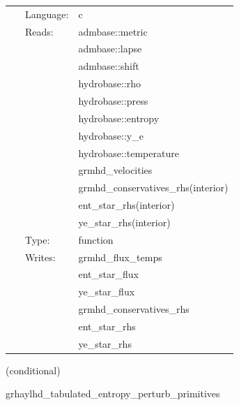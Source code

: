 \hspace{5mm}

 \begin{tabular*}{160mm}{cll} 
~ & Language:  & c \\ 
~ & Reads:  & admbase::metric \\ 
~& ~ &admbase::lapse\\ 
~& ~ &admbase::shift\\ 
~& ~ &hydrobase::rho\\ 
~& ~ &hydrobase::press\\ 
~& ~ &hydrobase::entropy\\ 
~& ~ &hydrobase::y\_e\\ 
~& ~ &hydrobase::temperature\\ 
~& ~ &grmhd\_velocities\\ 
~& ~ &grmhd\_conservatives\_rhs(interior)\\ 
~& ~ &ent\_star\_rhs(interior)\\ 
~& ~ &ye\_star\_rhs(interior)\\ 
~ & Type:  & function \\ 
~ & Writes:  & grmhd\_flux\_temps \\ 
~& ~ &ent\_star\_flux\\ 
~& ~ &ye\_star\_flux\\ 
~& ~ &grmhd\_conservatives\_rhs\\ 
~& ~ &ent\_star\_rhs\\ 
~& ~ &ye\_star\_rhs\\ 
\end{tabular*} 


\vspace{5mm}

   (conditional) 

\hspace{5mm} grhaylhd\_tabulated\_entropy\_perturb\_primitives 

\hspace{5mm}{\it entropy+tabulated version of grhaylhd\_perturb\_primitives } 


\hspace{5mm}

